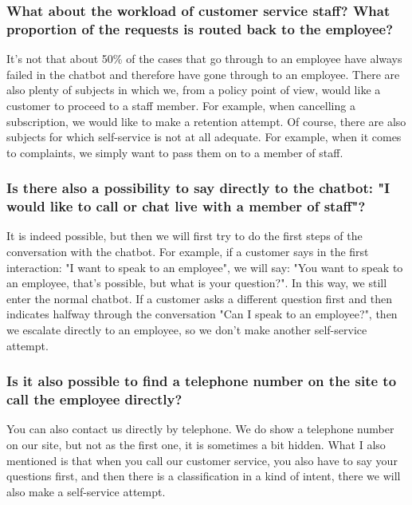 \begin{appendices}
	\subsubsection{What about the workload of customer service staff?
		What proportion of the requests is routed back to the employee?}
	It's not that about 50\% of the cases that go through to an employee have always failed in the chatbot and therefore have gone through to an employee. There are also plenty of subjects in which we, from a policy point of view, would like a customer to proceed to a staff member. For example, when cancelling a subscription, we would like to make a retention attempt. Of course, there are also subjects for which self-service is not at all adequate. For example, when it comes to complaints, we simply want to pass them on to a member of staff. 
	
	\subsubsection{Is there also a possibility to say directly to the chatbot: "I would like to call or chat live with a member of staff"?}
	It is indeed possible, but then we will first try to do the first steps of the conversation with the chatbot. For example, if a customer says in the first interaction: "I want to speak to an employee", we will say: "You want to speak to an employee, that's possible, but what is your question?". In this way, we still enter the normal chatbot. If a customer asks a different question first and then indicates halfway through the conversation "Can I speak to an employee?", then we escalate directly to an employee, so we don't make another self-service attempt. 
	
	\subsubsection{Is it also possible to find a telephone number on the site to call the employee directly?}
	You can also contact us directly by telephone. We do show a telephone number on our site, but not as the first one, it is sometimes a bit hidden. What I also mentioned is that when you call our customer service, you also have to say your questions first, and then there is a classification in a kind of intent, there we will also make a self-service attempt. 
	

\end{appendices}
